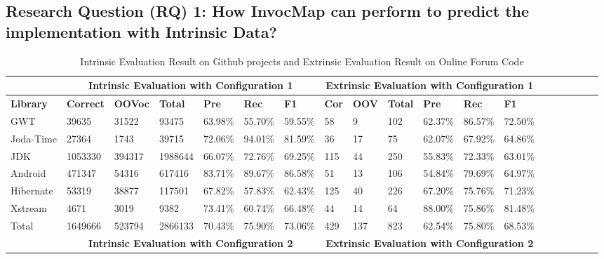\subsection{Research Question (RQ) 1: How InvocMap can perform to predict the implementation with Intrinsic Data?}

  \begin{table}[t]
  \tiny
  \centering
  \caption{Intrinsic Evaluation Result on Github projects and Extrinsic Evaluation Result on Online Forum Code}
\begin{tabular}{|l|l|l|l|l|l|l|l|l|l|l|l|l|l|l|l|l|l|l|}
\hline
          &  \multicolumn{6}{c|}{\textbf{Intrinsic Evaluation with Configuration 1}} &  \multicolumn{6}{c|}{\textbf{Extrinsic Evaluation with Configuration 1}}           \\
\hline
\textbf{Library}   & \textbf{Correct} & \textbf{OOVoc}  & \textbf{Total}   & \textbf{Pre} & \textbf{Rec}  & \textbf{F1} & \textbf{Cor} & \textbf{OOV}  & \textbf{Total}   & \textbf{Pre} & \textbf{Rec}  & \textbf{F1} \\ \hline
GWT       & 39635    & 31522  & 93475   & 63.98\%   & 55.70\% & 59.55\%   & 58              & 9     & 102   & 62.37\%   & 86.57\% & 72.50\%  \\ \hline
Joda-Time & 27364      & 1743   & 39715   & 72.06\%   & 94.01\% & 81.59\%  & 36             & 17    & 75    & 62.07\%   & 67.92\% & 64.86\%  \\ \hline
JDK       & 1053330   & 394317 & 1988644 & 66.07\%   & 72.76\% & 69.25\% & 115            & 44    & 250   & 55.83\%   & 72.33\% & 63.01\%  \\ \hline
Android   & 471347     & 54316  & 617416  & 83.71\%   & 89.67\% & 86.58\% & 51             & 13    & 106   & 54.84\%   & 79.69\% & 64.97\%  \\ \hline
Hibernate & 53319      & 38877  & 117501  & 67.82\%   & 57.83\% & 62.43\% & 125            & 40    & 226   & 67.20\%   & 75.76\% & 71.23\%  \\ \hline
Xstream   & 4671      & 3019   & 9382    & 73.41\%   & 60.74\% & 66.48\%  & 44             & 14    & 64    & 88.00\%   & 75.86\% & 81.48\%  \\ \hline
Total     & 1649666   & 523794 & 2866133 & 70.43\%   & 75.90\% & 73.06\%   & 429           & 137   & 823   & 62.54\%   & 75.80\% & 68.53\%  \\ \hline
          & \multicolumn{6}{c|}{\textbf{Intrinsic Evaluation with Configuration 2}}  & \multicolumn{6}{c|}{\textbf{Extrinsic Evaluation with Configuration 2}}   \\

\end{tabular}
\end{table}
